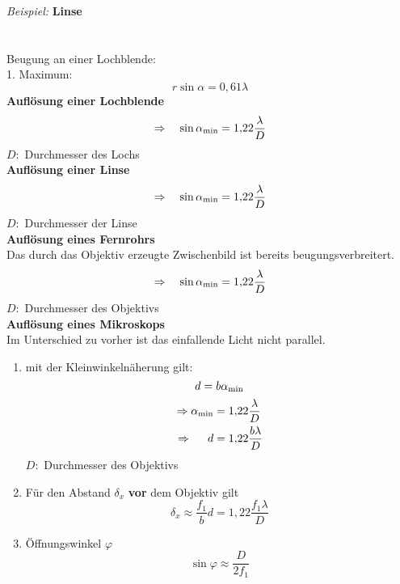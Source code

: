 \emph{Beispiel:} \textbf{Linse}\\
\\[5pt]
\\
Beugung an einer Lochblende:\\
1. Maximum:
\begin{equation*}
r \sin \alpha = 0{,}61 \lambda
\end{equation*}
\textbf{Auflösung einer Lochblende}
\begin{equation*}
\Rightarrow \quad \sin \alpha_{\textrm{min}} = 1{,}22 \frac{\lambda}{D}
\end{equation*}
$ D: $ Durchmesser des Lochs\\[5pt]
\textbf{Auflösung einer Linse}
\begin{equation*}
\Rightarrow \quad \sin \alpha_{\textrm{min}} = 1{,}22 \frac{\lambda}{D}
\end{equation*}
$ D: $ Durchmesser der Linse\\[5pt]
\textbf{Auflösung eines Fernrohrs}\\
Das durch das Objektiv erzeugte Zwischenbild ist bereits beugungsverbreitert.
\begin{equation*}
\Rightarrow \quad \sin \alpha_{\textrm{min}} = 1{,}22 \frac{\lambda}{D}
\end{equation*}
$ D: $ Durchmesser des Objektivs\\[5pt]
\textbf{Auflösung eines Mikroskops}\\
Im Unterschied zu vorher ist das einfallende Licht nicht parallel.\\
\begin{enumerate}[(1)]
	\item mit der Kleinwinkelnäherung gilt:
	\begin{equation*}
	d = b \alpha_{\textrm{min}}
	\end{equation*}
	\begin{align*}
	\Rightarrow \alpha_{\textrm{min}} &= 1{,}22 \frac{\lambda}{D} \\
	\Rightarrow \quad \: \, d &= 1{,}22 \frac{b \lambda}{D}
	\end{align*}
	$ D: $ Durchmesser des Objektivs
	\item Für den Abstand $ \delta_x $ \textbf{vor} dem Objektiv gilt
	\begin{equation*}
	\delta_x \approx \frac{f_1}{b} d = 1{,}22 \frac{f_1 \lambda}{D}
	\end{equation*}
	\item Öffnungswinkel $ \varphi $
	\begin{equation*}
	\sin \varphi \approx \frac{D}{2 f_1}
	\end{equation*}
\end{enumerate}

